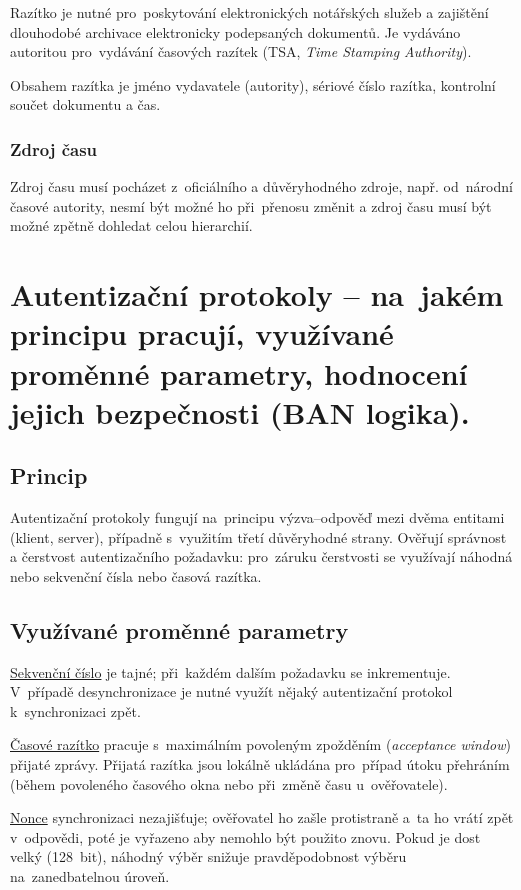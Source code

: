 Razítko je nutné pro~poskytování elektronických notářských služeb a zajištění dlouhodobé archivace elektronicky podepsaných dokumentů.
Je vydáváno autoritou pro~vydávání časových razítek (TSA, \emph{Time Stamping Authority}).

Obsahem razítka je jméno vydavatele (autority), sériové číslo razítka, kontrolní součet dokumentu a čas.

\subsubsection{Zdroj času}

Zdroj času musí pocházet z~oficiálního a důvěryhodného zdroje, např. od~národní časové autority, nesmí být možné ho při~přenosu změnit a zdroj času musí být možné zpětně dohledat celou hierarchií.


\clearpage
\section{Autentizační protokoly -- na~jakém principu pracují, využívané proměnné parametry, hodnocení jejich bezpečnosti (BAN logika).}

\subsection{Princip}

Autentizační protokoly fungují na~principu výzva--odpověď mezi dvěma entitami (klient, server), případně s~využitím třetí důvěryhodné strany.
Ověřují správnost a čerstvost autentizačního požadavku: pro~záruku čerstvosti se využívají náhodná nebo sekvenční čísla nebo časová razítka.


\subsection{Využívané proměnné parametry}

\uline{Sekvenční číslo} je tajné; při~každém dalším požadavku se inkrementuje.
V~případě desynchronizace je nutné využít nějaký autentizační protokol k~synchronizaci zpět.

\uline{Časové razítko} pracuje s~maximálním povoleným zpožděním (\emph{acceptance window}) přijaté zprávy.
Přijatá razítka jsou lokálně ukládána pro~případ útoku přehráním (během povoleného časového okna nebo při~změně času u~ověřovatele).

\uline{Nonce} synchronizaci nezajišťuje; ověřovatel ho zašle protistraně a~ta ho vrátí zpět v~odpovědi, poté je vyřazeno aby nemohlo být použito znovu.
Pokud je dost velký (128~bit), náhodný výběr snižuje pravděpodobnost výběru na~zanedbatelnou úroveň.


